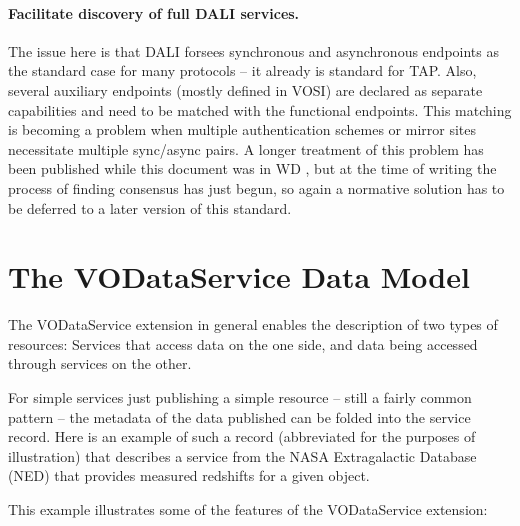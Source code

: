 \documentclass[11pt,a4paper]{ivoa}
\begin{document}
\paragraph{Facilitate discovery of full DALI services.}  The issue here
is that DALI forsees synchronous and asynchronous endpoints as the
standard case for many protocols -- it already is standard for TAP.
Also, several auxiliary endpoints (mostly defined in VOSI) are declared as
separate capabilities and need to be matched with the functional
endpoints.  This matching is becoming a problem when multiple
authentication schemes or mirror sites necessitate multiple sync/async
pairs.  A longer treatment of this problem has been published while this
document was in WD \citep{note:caproles}, but at the time of writing the
process of finding consensus has just begun, so again a normative
solution has to be deferred to a later version of this standard.



\section{The VODataService Data Model}
\label{sect:model}


The VODataService extension in general enables the description of two
types of resources:  Services that access data on the one side, and data
being accessed through services on the other.  

For simple services just publishing a simple resource -- still a fairly
common pattern -- the metadata of the data published can be folded into
the service record.
Here is an example of such a record (abbreviated for the
purposes of illustration) that describes a service from the NASA
Extragalactic Database (NED) that provides measured redshifts for a
given object.




This example illustrates some of the features of the VODataService
extension:
\end{document}

